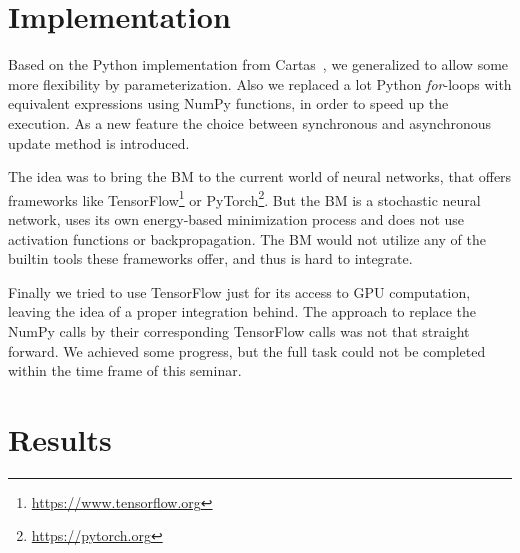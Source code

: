 \documentclass[12pt,twoside]{article}
\theoremstyle{plain}
\theoremstyle{definition}
\theoremstyle{remark}
\begin{document}
\section{Implementation}
\label{sec:impl}

Based on the Python implementation from Cartas~\cite{BMImpl}, we generalized to allow some more flexibility by parameterization. Also we replaced a lot Python \textit{for}-loops with equivalent expressions using NumPy functions, in order to speed up the execution. As a new feature the choice between synchronous and asynchronous update method is introduced.

The idea was to bring the BM to the current world of neural networks, that offers frameworks like TensorFlow\footnote{\url{https://www.tensorflow.org}} or PyTorch\footnote{\url{https://pytorch.org}}. But the BM is a stochastic neural network, uses its own energy-based minimization process and does not use activation functions or backpropagation. The BM would not utilize any of the builtin tools these frameworks offer, and thus is hard to integrate. 

Finally we tried to use TensorFlow just for its access to GPU computation, leaving the idea of a proper integration behind. The approach to replace the NumPy calls by their corresponding TensorFlow calls was not that straight forward. We achieved some progress, but the full task could not be completed within the time frame of this seminar.


%
%
%
%
%
%
%


\section{Results}
\label{sec:results}
\end{document}
